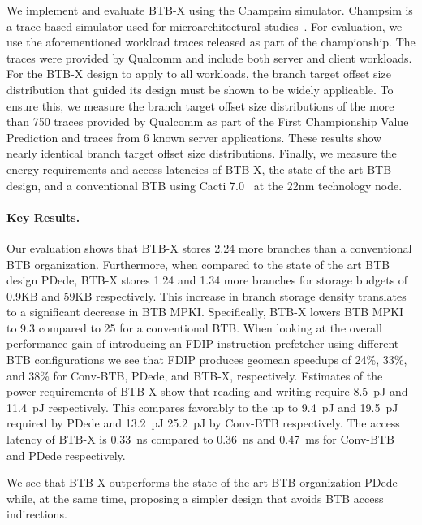 \documentclass[../main.tex]{subfiles}
\begin{document}
\begin{refsection}
We implement and evaluate BTB-X using the Champsim simulator. Champsim
is a trace-based simulator used for microarchitectural
studies~\cite{champsim}. For evaluation, we use the aforementioned
workload traces released as part of the 
championship. The traces were provided by Qualcomm and include both
server and client workloads. For the BTB-X design to apply to all
workloads, the branch target offset size distribution that guided its
design must be shown to be widely applicable. To ensure this, we
measure the branch target offset size distributions of the more than
750 traces provided by Qualcomm as part of the First Championship
Value Prediction  and traces from 6 known server
applications. These results show nearly identical branch target offset
size distributions.  Finally, we measure the energy requirements and
access latencies of BTB-X, the state-of-the-art BTB design, and a
conventional BTB using Cacti 7.0~\cite{cacti} at the 22nm technology
node.

\paragraph{Key Results.}

Our evaluation shows that BTB-X stores 2.24\texttimes{} more branches
than a conventional BTB organization. Furthermore, when compared to
the state of the art BTB design PDede, BTB-X stores 1.24\texttimes{}
and 1.34\texttimes{} more branches for storage budgets of 0.9KB and
59KB respectively. This increase in branch storage density translates
to a significant decrease in BTB MPKI. Specifically, BTB-X lowers BTB
MPKI to 9.3 compared to 25 for a conventional BTB. When looking at the
overall performance gain of introducing an FDIP instruction prefetcher
using different BTB configurations we see that FDIP produces geomean
speedups of 24\%, 33\%, and 38\% for Conv-BTB, PDede, and
BTB-X, respectively. Estimates of the power requirements of BTB-X show
that reading and writing require 8.5~pJ and 11.4~pJ respectively. This
compares favorably to the up to 9.4~pJ and 19.5~pJ
required by PDede and 13.2~pJ 25.2~pJ by Conv-BTB respectively. The
access latency of BTB-X is 0.33~ns compared to 0.36~ns and 0.47~ms for
Conv-BTB and PDede respectively.

We see that BTB-X outperforms the state of the art BTB organization PDede while, at the same time, proposing a simpler design that avoids BTB access indirections.




\end{refsection}
\end{document}
